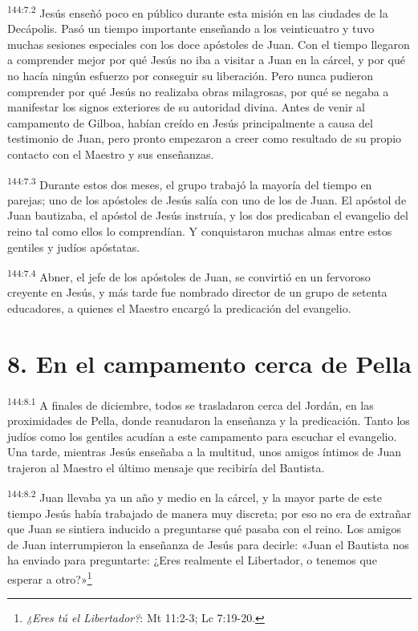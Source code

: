\par 
\textsuperscript{144:7.2} Jesús enseñó poco en público durante esta misión en las ciudades de la Decápolis. Pasó un tiempo importante enseñando a los veinticuatro y tuvo muchas sesiones especiales con los doce apóstoles de Juan. Con el tiempo llegaron a comprender mejor por qué Jesús no iba a visitar a Juan en la cárcel, y por qué no hacía ningún esfuerzo por conseguir su liberación. Pero nunca pudieron comprender por qué Jesús no realizaba obras milagrosas, por qué se negaba a manifestar los signos exteriores de su autoridad divina. Antes de venir al campamento de Gilboa, habían creído en Jesús principalmente a causa del testimonio de Juan, pero pronto empezaron a creer como resultado de su propio contacto con el Maestro y sus enseñanzas.

\par 
\textsuperscript{144:7.3} Durante estos dos meses, el grupo trabajó la mayoría del tiempo en parejas; uno de los apóstoles de Jesús salía con uno de los de Juan. El apóstol de Juan bautizaba, el apóstol de Jesús instruía, y los dos predicaban el evangelio del reino tal como ellos lo comprendían. Y conquistaron muchas almas entre estos gentiles y judíos apóstatas.

\par 
\textsuperscript{144:7.4} Abner, el jefe de los apóstoles de Juan, se convirtió en un fervoroso creyente en Jesús, y más tarde fue nombrado director de un grupo de setenta educadores, a quienes el Maestro encargó la predicación del evangelio.

\section*{8. En el campamento cerca de Pella}
\par 
\textsuperscript{144:8.1} A finales de diciembre, todos se trasladaron cerca del Jordán, en las proximidades de Pella, donde reanudaron la enseñanza y la predicación. Tanto los judíos como los gentiles acudían a este campamento para escuchar el evangelio. Una tarde, mientras Jesús enseñaba a la multitud, unos amigos íntimos de Juan trajeron al Maestro el último mensaje que recibiría del Bautista.

\par 
\textsuperscript{144:8.2} Juan llevaba ya un año y medio en la cárcel, y la mayor parte de este tiempo Jesús había trabajado de manera muy discreta; por eso no era de extrañar que Juan se sintiera inducido a preguntarse qué pasaba con el reino. Los amigos de Juan interrumpieron la enseñanza de Jesús para decirle: «Juan el Bautista nos ha enviado para preguntarte: ¿Eres realmente el Libertador, o tenemos que esperar a otro?»\footnote{\textit{¿Eres tú el Libertador?}: Mt 11:2-3; Lc 7:19-20.}

